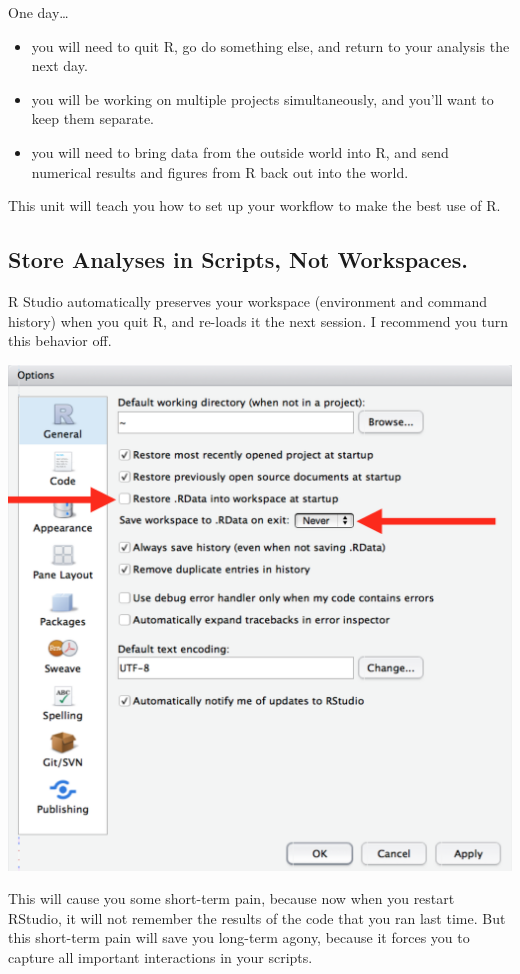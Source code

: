 \documentclass[]{book}
\providecommand{\tightlist}{%
  \setlength{\itemsep}{0pt}\setlength{\parskip}{0pt}}
\begin{document}
One day\ldots{}

\begin{itemize}
\tightlist
\item
  you will need to quit R, go do something else, and return to your analysis the next day.
\item
  you will be working on multiple projects simultaneously, and you'll want to keep them separate.
\item
  you will need to bring data from the outside world into R, and send numerical results and figures from R back out into the world.
\end{itemize}

This unit will teach you how to set up your workflow to make the best use of R.

\hypertarget{store-analyses-in-scripts-not-workspaces.}{%
\subsection{Store Analyses in Scripts, Not Workspaces.}\label{store-analyses-in-scripts-not-workspaces.}}

R Studio automatically preserves your workspace (environment and command history) when you quit R, and re-loads it the next session. I recommend you turn this behavior off.

\begin{center}\includegraphics[width=0.7\linewidth]{img/rstudio-workspace} \end{center}

This will cause you some short-term pain, because now when you restart RStudio, it will not remember the results of the code that you ran last time. But this short-term pain will save you long-term agony, because it forces you to capture all important interactions in your scripts.
\end{document}
